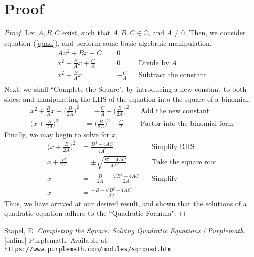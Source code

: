 \documentclass[12pt]{amsart}
\theoremstyle{definition}
\begin{document}
\section{Proof}
\begin{proof}
Let $A,B,C$ exist, such that $A,B,C\in\mathbb{C}$, and $A\neq 0$. Then, we consider equation (\ref{quad}), and perform some basic algebraic manipulation.
\begin{align*}
Ax^2+Bx+C & =0 &&\\
x^2+\frac{B}{A}x+\frac{C}{A}&=0 && \text{Divide by $A$} \\
x^2+\frac{B}{A}x&=-\frac{C}{A} && \text{Subtract the constant} \\
\end{align*}
Next, we shall ``Complete the Square"\cite{complete}, by introducing a new constant to both sides, and manipulating the LHS of the equation into the square of a binomial,
\begin{align*}
x^2+\frac{B}{A}x+\bigg(\frac{B}{2A}\bigg)^2&=-\frac{C}{A}+\bigg(\frac{B}{2A}\bigg)^2 && \text{Add the new constant} \\
\bigg(x+\frac{B}{2A}\bigg)^2 &= \bigg(\frac{B}{2A}\bigg)^2-\frac{C}{A} && \text{Factor into the binomial form}
\end{align*}
Finally, we may begin to solve for $x$,
\begin{align*}
\bigg(x+\frac{B}{2A}\bigg)^2 &= \frac{B^2-4AC}{4A^2} && \text{Simplify RHS}\\
x+\frac{B}{2A}&=\pm\sqrt{\frac{B^2-4AC}{4A^2}} && \text{Take the square root} \\
x&=-\frac{B}{2A}\pm\frac{\sqrt{B^2-4AC}}{2A} && \text{Simplify}\\
x&=\frac{-B\pm\sqrt{B^2-4AC}}{2A}
\end{align*}
Thus, we have arrived at our desired result, and shown that the solutions of a quadratic equation adhere to the ``Quadratic Formula".
\end{proof}
\newpage
\begin{thebibliography}{9}

Stapel, E.
\textit{Completing the Square: Solving Quadratic Equations | Purplemath}. [online] Purplemath. Available at: 
\texttt{https://www.purplemath.com/modules/sqrquad.htm}

\end{thebibliography}
\end{document}
